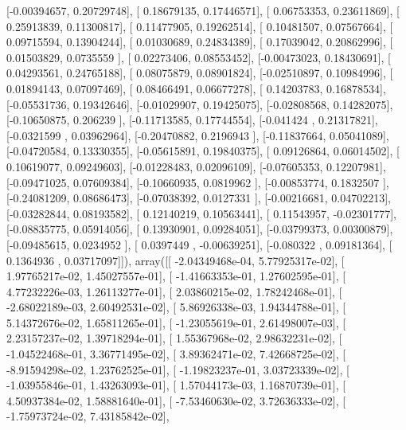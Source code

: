 \documentclass{article}
\begin{document}
       [-0.00394657,  0.20729748],
       [ 0.18679135,  0.17446571],
       [ 0.06753353,  0.23611869],
       [ 0.25913839,  0.11300817],
       [ 0.11477905,  0.19262514],
       [ 0.10481507,  0.07567664],
       [ 0.09715594,  0.13904244],
       [ 0.01030689,  0.24834389],
       [ 0.17039042,  0.20862996],
       [ 0.01503829,  0.0735559 ],
       [ 0.02273406,  0.08553452],
       [-0.00473023,  0.18430691],
       [ 0.04293561,  0.24765188],
       [ 0.08075879,  0.08901824],
       [-0.02510897,  0.10984996],
       [ 0.01894143,  0.07097469],
       [ 0.08466491,  0.06677278],
       [ 0.14203783,  0.16878534],
       [-0.05531736,  0.19342646],
       [-0.01029907,  0.19425075],
       [-0.02808568,  0.14282075],
       [-0.10650875,  0.206239  ],
       [-0.11713585,  0.17744554],
       [-0.041424  ,  0.21317821],
       [-0.0321599 ,  0.03962964],
       [-0.20470882,  0.2196943 ],
       [-0.11837664,  0.05041089],
       [-0.04720584,  0.13330355],
       [-0.05615891,  0.19840375],
       [ 0.09126864,  0.06014502],
       [ 0.10619077,  0.09249603],
       [-0.01228483,  0.02096109],
       [-0.07605353,  0.12207981],
       [-0.09471025,  0.07609384],
       [-0.10660935,  0.0819962 ],
       [-0.00853774,  0.1832507 ],
       [-0.24081209,  0.08686473],
       [-0.07038392,  0.0127331 ],
       [-0.00216681,  0.04702213],
       [-0.03282844,  0.08193582],
       [ 0.12140219,  0.10563441],
       [ 0.11543957, -0.02301777],
       [-0.08835775,  0.05914056],
       [ 0.13930901,  0.09284051],
       [-0.03799373,  0.00300879],
       [-0.09485615,  0.0234952 ],
       [ 0.0397449 , -0.00639251],
       [-0.080322  ,  0.09181364],
       [ 0.1364936 ,  0.03717097]]), array([[ -2.04349468e-04,   5.77925317e-02],
       [  1.97765217e-02,   1.45027557e-01],
       [ -1.41663353e-01,   1.27602595e-01],
       [  4.77232226e-03,   1.26113277e-01],
       [  2.03860215e-02,   1.78242468e-01],
       [ -2.68022189e-03,   2.60492531e-02],
       [  5.86926338e-03,   1.94344788e-01],
       [  5.14372676e-02,   1.65811265e-01],
       [ -1.23055619e-01,   2.61498007e-03],
       [  2.23157237e-02,   1.39718294e-01],
       [  1.55367968e-02,   2.98632231e-02],
       [ -1.04522468e-01,   3.36771495e-02],
       [  3.89362471e-02,   7.42668725e-02],
       [ -8.91594298e-02,   1.23762525e-01],
       [ -1.19823237e-01,   3.03723339e-02],
       [ -1.03955846e-01,   1.43263093e-01],
       [  1.57044173e-03,   1.16870739e-01],
       [  4.50937384e-02,   1.58881640e-01],
       [ -7.53460630e-02,   3.72636333e-02],
       [ -1.75973724e-02,   7.43185842e-02],
\end{document}
